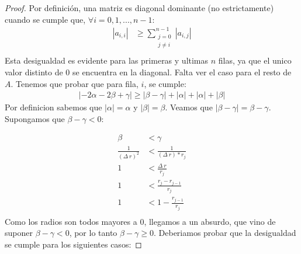   \begin{proof}
    Por definición, una matriz es diagonal dominante (no estrictamente) cuando se cumple que, $\forall i = 0,1,...,n-1$:
    \begin{equation*}
        \begin{aligned}
          |a_{i,i}| &\geq \sum\limits_{\substack{j=0  \\ j \neq i}}^{n-1} |a_{i,j}| \\
        \end{aligned}
    \end{equation*}
    Esta desigualdad es evidente para las primeras  y ultimas $n$ filas, ya que el unico valor distinto de 0 se encuentra en la diagonal.
    Falta ver el caso para el resto de $A$. Tenemos que probar que para fila, $i$, se cumple:
    \begin{equation*}
        \begin{aligned}
          |-2\alpha-2\beta+\gamma| \geq |\beta - \gamma| + |\alpha| + |\alpha| + |\beta|
        \end{aligned}
    \end{equation*}
    \newline
    Por definicion sabemos que $|\alpha| = \alpha$ y $|\beta| = \beta$.
    \newline
    \newline
    Veamos que $|\beta - \gamma| = \beta - \gamma$. Supongamos que $\beta - \gamma < 0$:

    \begin{equation*}
        \begin{aligned}
          \beta &< \gamma \\
          \frac{1}{(\Delta\ r)^2}  &< \frac{1}{(\Delta\ r) * r_{j}} \\
          1 &< \frac{\Delta\ r}{r_{j}} \\
          1 &< \frac{r_{j} - r_{j-1}}{r_{j}} \\
          1 &< 1 - \frac{r_{j-1}}{r_{j}} \\
        \end{aligned}
    \end{equation*}
    Como los radios son todos mayores a 0, llegamos a un absurdo, que vino de suponer $\beta - \gamma < 0$, por lo tanto $\beta - \gamma \geq 0$.
    \newline
    \newline
    Deberiamos probar que la desigualdad se cumple para los siguientes casos:


\end{proof}

